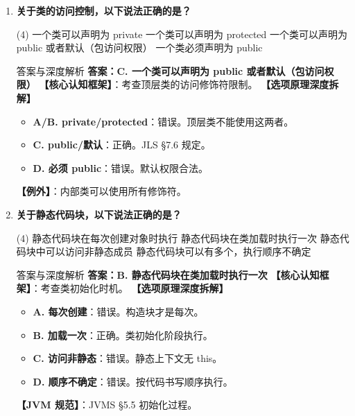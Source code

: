 \documentclass[12pt, a4paper]{ctexart}
\begin{document}
\begin{enumerate}[label=\textbf{\arabic*.}, itemsep=1em]
    \item \textbf{关于类的访问控制，以下说法正确的是？}
    \begin{tasks}(4)
        \task 一个类可以声明为 private \task 一个类可以声明为 protected
        \task 一个类可以声明为 public 或者默认（包访问权限） \task 一个类必须声明为 public
    \end{tasks}
    \begin{bluebox}{答案与深度解析}
    \textbf{答案：C. 一个类可以声明为 public 或者默认（包访问权限）}
    \textbf{【核心认知框架】}：考查顶层类的访问修饰符限制。
    \textbf{【选项原理深度拆解】}
    \begin{itemize}[leftmargin=*, nosep]
        \item \textbf{A/B. private/protected}：错误。顶层类不能使用这两者。
        \item \textbf{C. public/默认}：正确。JLS §7.6 规定。
        \item \textbf{D. 必须 public}：错误。默认权限合法。
    \end{itemize}
    \textbf{【例外】}：内部类可以使用所有修饰符。
    \end{bluebox}

    \item \textbf{关于静态代码块，以下说法正确的是？}
    \begin{tasks}(4)
        \task 静态代码块在每次创建对象时执行 \task 静态代码块在类加载时执行一次
        \task 静态代码块中可以访问非静态成员 \task 静态代码块可以有多个，执行顺序不确定
    \end{tasks}
    \begin{bluebox}{答案与深度解析}
    \textbf{答案：B. 静态代码块在类加载时执行一次}
    \textbf{【核心认知框架】}：考查类初始化时机。
    \textbf{【选项原理深度拆解】}
    \begin{itemize}[leftmargin=*, nosep]
        \item \textbf{A. 每次创建}：错误。构造块才是每次。
        \item \textbf{B. 加载一次}：正确。类初始化阶段执行。
        \item \textbf{C. 访问非静态}：错误。静态上下文无 this。
        \item \textbf{D. 顺序不确定}：错误。按代码书写顺序执行。
    \end{itemize}
    \textbf{【JVM 规范】}：JVMS §5.5 初始化过程。
    \end{bluebox}


\end{enumerate}
\end{document}
